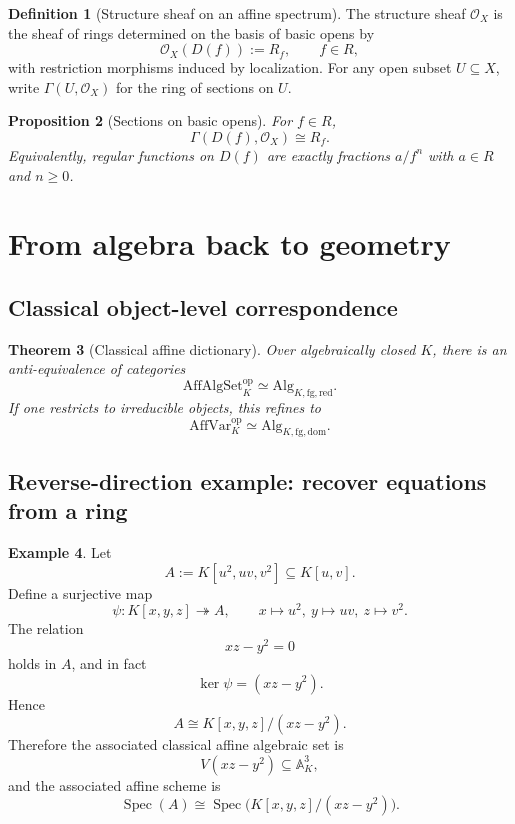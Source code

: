 \documentclass[12pt, a4paper]{article}
\newtheorem{theorem}{Theorem}[section]
\newtheorem{proposition}[theorem]{Proposition}
\theoremstyle{definition}
\newtheorem{definition}[theorem]{Definition}
\newtheorem{example}[theorem]{Example}
\DeclareMathOperator{\Spec}{Spec}
\newcommand{\A}{\mathbb{A}}
\newcommand{\OO}{\mathcal{O}}
\newcommand{\AffAlgSetK}{\mathrm{AffAlgSet}_K}
\newcommand{\AffVarK}{\mathrm{AffVar}_K}
\newcommand{\AlgKfgred}{\mathrm{Alg}_{K,\mathrm{fg},\mathrm{red}}}
\newcommand{\AlgKfgdom}{\mathrm{Alg}_{K,\mathrm{fg},\mathrm{dom}}}
\begin{document}
\begin{definition}[Structure sheaf on an affine spectrum]
The structure sheaf $\OO_X$ is the sheaf of rings determined on the basis of basic opens by
\[
\OO_X(D(f)):=R_f,
\qquad f\in R,
\]
with restriction morphisms induced by localization. For any open subset $U\subseteq X$, write $\Gamma(U,\OO_X)$ for the ring of sections on $U$.
\end{definition}

\begin{proposition}[Sections on basic opens]
For $f\in R$,
\[
\boxed{\Gamma(D(f),\OO_X)\cong R_f.}
\]
Equivalently, regular functions on $D(f)$ are exactly fractions $a/f^n$ with $a\in R$ and $n\ge 0$.
\end{proposition}

\section{From algebra back to geometry}

\subsection{Classical object-level correspondence}

\begin{theorem}[Classical affine dictionary]
Over algebraically closed $K$, there is an anti-equivalence of categories
\[
\boxed{\AffAlgSetK^{\mathrm{op}}\simeq \AlgKfgred.}
\]
If one restricts to irreducible objects, this refines to
\[
\AffVarK^{\mathrm{op}}\simeq \AlgKfgdom.
\]
\end{theorem}

\subsection{Reverse-direction example: recover equations from a ring}

\begin{example}
Let
\[
A:=K[u^2,uv,v^2]\subseteq K[u,v].
\]
Define a surjective map
\[
\psi:K[x,y,z]\twoheadrightarrow A,
\qquad
x\mapsto u^2,\ y\mapsto uv,\ z\mapsto v^2.
\]
The relation
\[
xz-y^2=0
\]
holds in $A$, and in fact
\[
\ker\psi=(xz-y^2).
\]
Hence
\[
A\cong K[x,y,z]/(xz-y^2).
\]
Therefore the associated classical affine algebraic set is
\[
V(xz-y^2)\subseteq \A_K^3,
\]
and the associated affine scheme is
\[
\Spec(A)\cong \Spec\big(K[x,y,z]/(xz-y^2)\big).
\]
\end{example}
\end{document}
